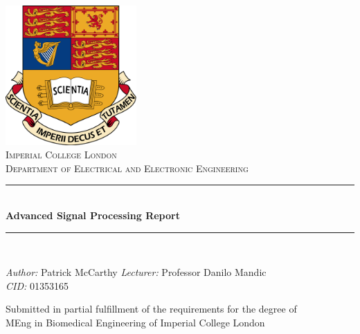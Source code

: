 \begin{titlepage}

\newcommand{\HRule}{\rule{\linewidth}{0.5mm}} 

\center 

\includegraphics[width = 5cm]{logo.png}\\[0.5cm] 

\textsc{\Large Imperial College London}\\[0.5cm] 
\textsc{\Large Department of Electrical and Electronic Engineering}\\[0.5cm] 

\HRule \\[0.4cm]
{ \Huge \bfseries \reporttitle Advanced Signal Processing Report}\\ %
\HRule \\[0.5cm]
 
\begin{minipage}{0.95\textwidth}
\begin{flushleft} \Large
\emph{Author:}
Patrick McCarthy
\hspace{3cm}
\emph{Lecturer:}
Professor Danilo Mandic\\
\emph{CID:}
01353165
\end{flushleft}
\end{minipage}

\vspace{10.5cm} %
\Large{Submitted in partial fulfillment of the requirements for the degree of \\MEng in Biomedical Engineering
of Imperial College London}\\[0.5cm]

\makeatletter
\@date 
\makeatother

\end{titlepage}
